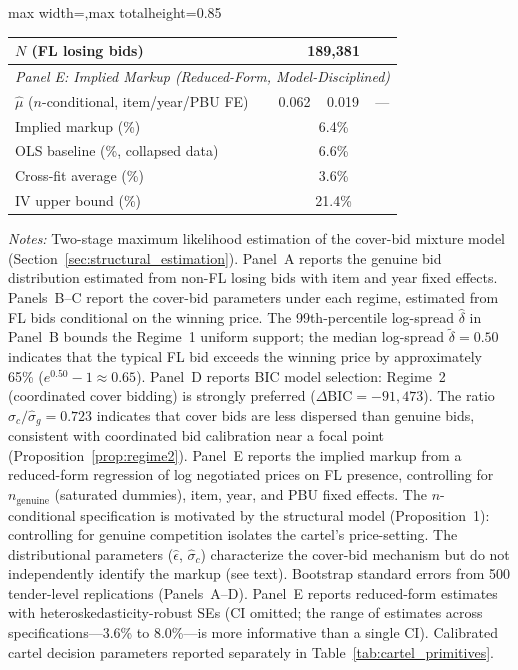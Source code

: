 \begin{table}[!htbp]
\begin{adjustbox}{max width=\textwidth,max totalheight=0.85\textheight}
\begin{threeparttable}
\begin{tabular}{lccc}
$N$ (FL losing bids) & \multicolumn{3}{c}{189,381} \\
\midrule
\multicolumn{4}{l}{\textit{Panel E: Implied Markup (Reduced-Form, Model-Disciplined)}} \\[3pt] %
$\hat{\mu}$ ($n$-conditional, item/year/PBU FE) & 0.062 & 0.019 & --- \\
Implied markup (\%) & \multicolumn{3}{c}{6.4\%} \\
OLS baseline (\%, collapsed data) & \multicolumn{3}{c}{6.6\%} \\
Cross-fit average (\%) & \multicolumn{3}{c}{3.6\%} \\
IV upper bound (\%) & \multicolumn{3}{c}{21.4\%} \\
\bottomrule
\end{tabular}
\begin{tablenotes}
\small
\item \textit{Notes:} Two-stage maximum likelihood estimation of the cover-bid
mixture model (Section~\ref{sec:structural_estimation}). Panel~A reports the
genuine bid distribution estimated from non-FL losing bids with item and year
fixed effects. Panels~B--C report the cover-bid parameters under each regime,
estimated from FL bids conditional on the winning price. The 99th-percentile
log-spread $\hat{\delta}$ in Panel~B bounds the Regime~1 uniform support;
the median log-spread $\tilde{\delta} = 0.50$ indicates that the typical FL
bid exceeds the winning price by approximately 65\%
($e^{0.50} - 1 \approx 0.65$). Panel~D reports BIC model selection: Regime~2
(coordinated cover bidding) is strongly preferred ($\Delta\text{BIC} =
-91{,}473$). The ratio $\hat{\sigma}_c / \hat{\sigma}_g = 0.723$ indicates
that cover bids are less dispersed than genuine bids, consistent with
coordinated bid calibration near a focal point (Proposition~\ref{prop:regime2}).
Panel~E reports the implied markup from a reduced-form regression
of log negotiated prices on FL presence, controlling for
$n_{\text{genuine}}$ (saturated dummies), item, year, and PBU fixed
effects. The $n$-conditional specification is motivated by the
structural model (Proposition~1): controlling for genuine competition
isolates the cartel's price-setting. The distributional parameters
($\hat{\epsilon}$, $\hat{\sigma}_c$) characterize the cover-bid
mechanism but do not independently identify the markup (see text).
Bootstrap standard errors from 500 tender-level replications
(Panels~A--D). Panel~E reports reduced-form estimates with
heteroskedasticity-robust SEs (CI omitted; the range of estimates
across specifications---3.6\% to 8.0\%---is more informative than
a single CI).
Calibrated cartel decision parameters reported separately in
Table~\ref{tab:cartel_primitives}.
\end{tablenotes}
\end{threeparttable}
\end{adjustbox}
\end{table}
